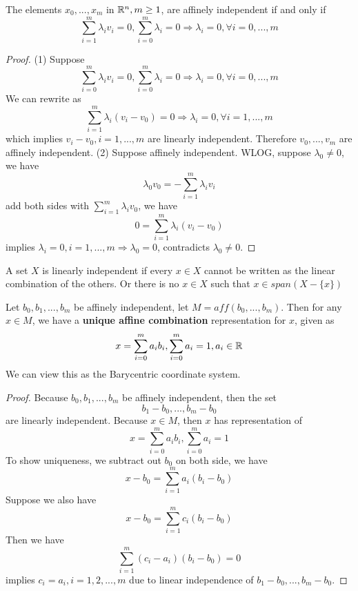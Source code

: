 \begin{refsection}
\begin{lemma}\cite[23]{mordukhovich2013easy} 
	The elements $x_0,...,x_m$ in $\mathbb{R}^n,m \geq 1$, are affinely independent if	and only if
	$$\sum_{i=1}^m \lambda_i v_i = 0,\sum_{i=0}^m \lambda_i = 0 \Rightarrow \lambda_i = 0, \forall i=0,...,m$$
\end{lemma}
\begin{proof}
(1) Suppose 
	$$\sum_{i=0}^m \lambda_i v_i = 0,\sum_{i=0}^m \lambda_i = 0 \Rightarrow \lambda_i = 0, \forall i=0,...,m$$
	We can rewrite as
		$$\sum_{i=1}^m \lambda_i (v_i-v_0) = 0 \Rightarrow \lambda_i = 0, \forall i=1,...,m$$
		which implies $v_i-v_0,i=1,...,m$ are linearly independent. Therefore $v_0,...,v_m$ are affinely independent.
(2) Suppose affinely independent. WLOG, suppose $\lambda_0 \neq 0$, we have
$$\lambda_0 v_0 = -\sum_{i=1}^m \lambda_i v_i$$
add both sides with $\sum_{i=1}^m \lambda_i v_0$, we have
$$ 0 = \sum_{i=1}^m \lambda_i (v_i - v_0)$$
implies $\lambda_i = 0,i=1,...,m \Rightarrow \lambda_0 = 0$, contradicts $\lambda_0 \neq 0$.
\end{proof}



\begin{remark}
	A set $X$ is linearly independent if every $x\in X$ cannot be written as the linear combination of the others. Or there is no $x\in X$ such that $x\in span(X-\{x\})$
\end{remark}

\begin{theorem}\label{ch:convex-analysis:th:affineBaricenteric}
Let $b_0,b_1,...,b_m$ be affinely independent, let $M=aff(b_0,...,b_m)$. Then for any $x\in M$, we have a \textbf{unique affine combination} representation for $x$, given as
$$x = \sum_{i=0}^m a_ib_i,\sum_{i=0}^m a_i = 1,a_i\in \mathbb{R}$$
We can view this as the Barycentric coordinate system.
\end{theorem}
\begin{proof}
Because $b_0,b_1,...,b_m$ be affinely independent, then the set
$$b_1-b_0,...,b_m-b_0$$ are linearly independent. Because $x\in M$, then $x$ has representation of
$$x = \sum_{i=0}^m a_ib_i,\sum_{i=0}^m a_i = 1$$
To show uniqueness, we subtract out $b_0$ on both side, we have
$$x-b_0 = \sum_{i=1}^m a_i(b_i-b_0)$$
Suppose we also have 
$$x-b_0 = \sum_{i=1}^m c_i(b_i-b_0)$$
Then we have 
$$\sum_{i=1}^m (c_i-a_i)(b_i-b_0) = 0$$
implies $c_i=a_i,i=1,2,...,m$ due to linear independence of $b_1-b_0,...,b_m-b_0$.
\end{proof}





\end{refsection}

